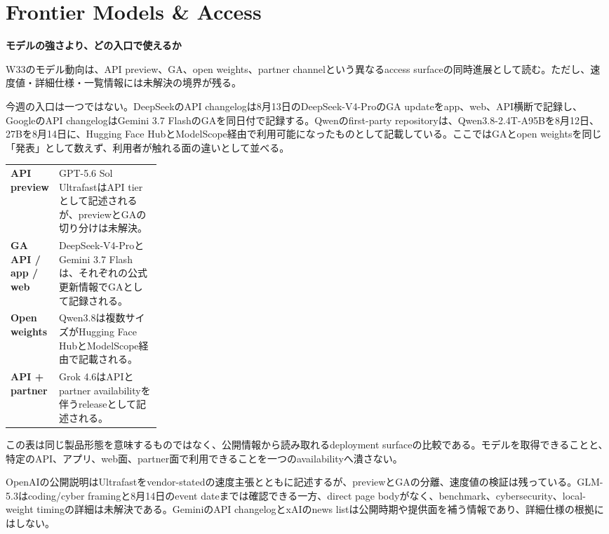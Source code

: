 \section{Frontier Models \& Access}
\begin{wideflow}
{\Large\bfseries モデルの強さより、どの入口で使えるか}\par
\smallskip
{\color{SurveyMuted}W33のモデル動向は、API preview、GA、open weights、partner channelという異なるaccess surfaceの同時進展として読む。ただし、速度値・詳細仕様・一覧情報には未解決の境界が残る。}\par
\end{wideflow}

今週の入口は一つではない。DeepSeekのAPI changelogは8月13日のDeepSeek-V4-ProのGA updateをapp、web、API横断で記録し、GoogleのAPI changelogはGemini 3.7 FlashのGAを同日付で記録する\cite{deepseek-updates,gemini-flash,gemini-changelog}。Qwenのfirst-party repositoryは、Qwen3.8-2.4T-A95Bを8月12日、27Bを8月14日に、Hugging Face HubとModelScope経由で利用可能になったものとして記載している\cite{qwen38}。ここではGAとopen weightsを同じ「発表」として数えず、利用者が触れる面の違いとして並べる。

\begin{themeoverview}
\begin{tabularx}{\linewidth}{@{}>{\bfseries}p{0.25\linewidth}X@{}}
API preview & GPT-5.6 Sol UltrafastはAPI tierとして記述されるが、previewとGAの切り分けは未解決\cite{ultrafast}。\\
GA API / app / web & DeepSeek-V4-ProとGemini 3.7 Flashは、それぞれの公式更新情報でGAとして記録される。\\
Open weights & Qwen3.8は複数サイズがHugging Face HubとModelScope経由で記載される。\\
API + partner & Grok 4.6はAPIとpartner availabilityを伴うreleaseとして記述される\cite{grok46}。
\end{tabularx}
\end{themeoverview}

この表は同じ製品形態を意味するものではなく、公開情報から読み取れるdeployment surfaceの比較である。モデルを取得できることと、特定のAPI、アプリ、web面、partner面で利用できることを一つのavailabilityへ潰さない。

\begin{claimboundary}[未解決の境界]
OpenAIの公開説明はUltrafastをvendor-statedの速度主張とともに記述するが、previewとGAの分離、速度値の検証は残っている。GLM-5.3はcoding/cyber framingと8月14日のevent dateまでは確認できる一方、direct page bodyがなく、benchmark、cybersecurity、local-weight timingの詳細は未解決である\cite{glm53}。GeminiのAPI changelogとxAIのnews listは公開時期や提供面を補う情報であり、詳細仕様の根拠にはしない\cite{gemini-changelog,xai-news}。
\end{claimboundary}

